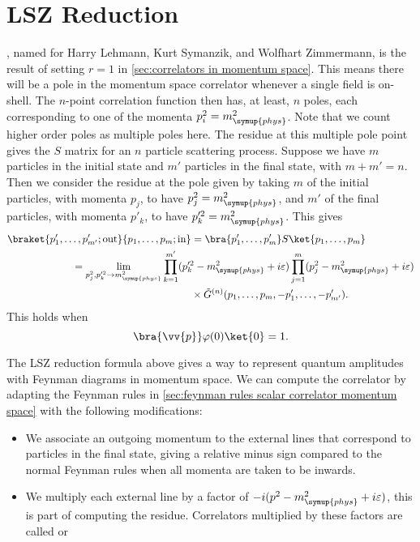 \documentclass[fleqn]{NotesClass}
\newcommand{\phys}{\symup{phys}}
\begin{document}
    \section{LSZ Reduction}
    , named for Harry Lehmann, Kurt Symanzik, and Wolfhart Zimmermann, is the result of setting \(r = 1\) in \cref{sec:correlators in momentum space}.
    This means there will be a pole in the momentum space correlator whenever a single field is on-shell.
    The \(n\)-point correlation function then has, at least, \(n\) poles, each corresponding to one of the momenta \(p_i^2 = m_{\phys}^2\).
    Note that we count higher order poles as multiple poles here.
    The residue at this multiple pole point gives the \(S\) matrix for an \(n\) particle scattering process.
    Suppose we have \(m\) particles in the initial state and \(m'\) particles in the final state, with \(m + m' = n\).
    Then we consider the residue at the pole given by taking \(m\) of the initial particles, with momenta \(p_j\), to have \(p_j^2 = m_{\phys}^2\), and \(m'\) of the final particles, with momenta \(p'_k\), to have \(p_k^{\prime 2} = m_{\phys}^2\).
    This gives
    \begin{align}
        \braket{p_1', \dotsc, p'_{m'}; \text{out}}{p_1, \dotsc, p_m; \text{in}} &= \bra{p'_1, \dotsc, p'_m} S \ket{p_1, \dotsc, p_m}\\
        &\mkern-210mu= \lim_{p_j^2, p_k^{\prime 2} \to m_{\phys}^2} \prod_{k=1}^{m'} (p_k^{\prime 2} - m_{\phys}^2 + i\varepsilon) \prod_{j=1}^{m} (p_j^2 - m_{\phys}^2 + i\varepsilon) \notag\\
        &\times \tilde{G}^{(n)}(p_1, \dotsc, p_m, -p'_1, \dotsc, -p'_{m'}).
    \end{align}
    This holds when
    \begin{equation}
        \bra{\vv{p}} \varphi(0) \ket{0} = 1.
    \end{equation}
    
    The LSZ reduction formula above gives a way to represent quantum amplitudes with Feynman diagrams in momentum space.
    We can compute the correlator by adapting the Feynman rules in \cref{sec:feynman rules scalar correlator momentum space} with the following modifications:
    \begin{itemize}
        \item We associate an outgoing momentum to the external lines that correspond to particles in the final state, giving a relative minus sign compared to the normal Feynman rules when all momenta are taken to be inwards.
        \item We multiply each external line by a factor of \(-i(p^2 - m_{\phys}^2 + i\varepsilon)\), this is part of computing the residue.
        Correlators multiplied by these factors are called  or 
    \end{itemize}
    
\end{document}

